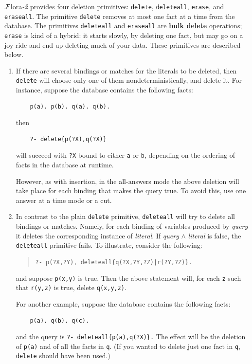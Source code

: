 \documentclass[11pt]{article}
\newcommand{\FLORA}{{\mbox{\sc ${\cal F}${lora}\rm\emph{-2}}}\xspace}
\newcommand{\FLSYSTEM}{\FLORA}
\begin{document}
\FLSYSTEM provides four deletion primitives: {\tt delete}, {\tt deleteall},
{\tt erase}, and {\tt eraseall}. The primitive {\tt delete} removes at most
one fact at a time from the database. The primitives {\tt deleteall} and
{\tt eraseall} are {\bf bulk delete} operations; {\tt erase} is kind of a
hybrid: it starts slowly, by deleting one fact, but may go on a joy ride
and end up deleting much of your data. These primitives are described
below.
\begin{enumerate}
\item If there are several bindings or matches for the literals to be
  deleted, then {\tt delete} will choose only one of them
  nondeterministically, and delete it.  For instance, suppose the database
  contains the following facts:
  \begin{verbatim}
    p(a). p(b). q(a). q(b).
  \end{verbatim}
  then
  \begin{verbatim}
    ?- delete{p(?X),q(?X)}
  \end{verbatim}
  will succeed with {\tt ?X} bound to either {\tt a} or {\tt b},
  depending on the ordering of facts in the database at runtime.

  However, as with insertion, in the all-answers mode the above deletion
  will take place for each binding that makes the query true. To avoid
  this, use one answer at a time mode or a cut.
      
\item In contrast to the plain {\tt delete} primitive, {\tt deleteall} will
  try to delete all bindings or matches.  Namely, for each binding of
  variables produced by \emph{query} it deletes the corresponding instance
  of \emph{literal}. If \emph{query} $\wedge$ \emph{literal} is false, the
  {\tt deleteall} primitive fails.  To illustrate, consider the following:
  \begin{quote}
    {\tt ?- p(?X,?Y), deleteall\{q(?X,?Y,?Z)|r(?Y,?Z)\}.}
  \end{quote}
  and suppose {\tt p(x,y)} is true. Then the above statement will, for
  each {\tt z} such that {\tt r(y,z)} is true,
  delete {\tt q(x,y,z)}.
  
  For another example, suppose the database contains the following facts:
  \begin{verbatim}
    p(a). q(b). q(c).
  \end{verbatim}
  and the query is {\tt ?- deleteall\{p(a),q(?X)\}.} The effect will be 
  the deletion of {\tt p(a)} and of all the facts in {\tt q}. (If you
  wanted to delete just one fact in {\tt q}, {\tt delete} should
  have been used.)
  

\end{enumerate}
\end{document}
